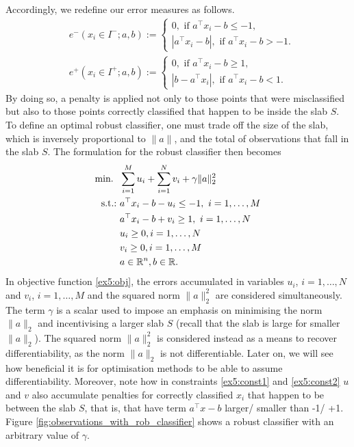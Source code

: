 Accordingly, we redefine our error measures as follows. 
%
\begin{align*}
	& e^-(x_i \in I^-; a, b) := 
	    \begin{cases} 0, \text{ if } a^\top x_i - b \leq -1, \\
	        |a^\top x_i - b|, \text{ if } a^\top x_i - b > -1.
	    \end{cases} \\
	& e^+(x_i \in I^+; a, b) := 
	    \begin{cases} 0, \text{ if } a^\top x_i - b \geq 1, \\
	        |b -  a^\top x_i|, \text{ if } a^\top x_i - b < 1.
	    \end{cases}                   
\end{align*}
%
By doing so, a penalty is applied not only to those points that were misclassified but also to those points correctly classified that happen to be inside the slab $S$. To define an optimal robust classifier, one must trade off the size of the slab, which is inversely proportional to $\|a\|$, and the total of observations that fall in the slab $S$. The formulation for the robust classifier then becomes
%
\begin{align}
	\mathop{\text{min.~}} \ & \sum_{i=1}^M u_i + \sum_{i=1}^N v_i + \gamma\|a\|_2^2 \label{ex5:obj}\\
	\mathop{\text{s.t.:~}} & a^\top x_i - b - u_i \leq -1, \ i = 1,\dots,M \label{ex5:const1} \\
	    & a^\top x_i - b + v_i \geq 1, \ i = 1,\dots,N \label{ex5:const2} \\
	    & u_i \geq 0, i = 1, \dots, N \\
	    & v_i \geq 0, i = 1, \dots, M \\
	    & a \in \mathbb{R}^n, b \in \mathbb{R}.
\end{align} 
%  
In objective function \eqref{ex5:obj}, the errors accumulated in variables $u_i$, $i=1,\dots,N$ and $v_i$, $i = 1,\dots,M$ and the squared norm $\|a\|_2^2$ are considered simultaneously. The term $\gamma$ is a scalar used to impose an emphasis on minimising the norm $\|a\|_2$ and incentivising a larger slab $S$ (recall that the slab is large for smaller $\|a\|_2$). The squared norm  $\|a\|_2^2$ is considered instead as a means to recover differentiability, as the norm  $\|a\|_2$ is not differentiable. Later on, we will see how beneficial it is for optimisation methods to be able to assume differentiability. Moreover, note how in constraints \eqref{ex5:const1} and \eqref{ex5:const2} $u$ and $v$ also accumulate penalties for correctly classified $x_i$ that happen to be between the slab $S$, that is, that have term $a^\top x - b$ larger/ smaller than -1/ +1. Figure \ref{fig:observations_with_rob_classifier} shows a robust classifier with an arbitrary value of $\gamma$.

